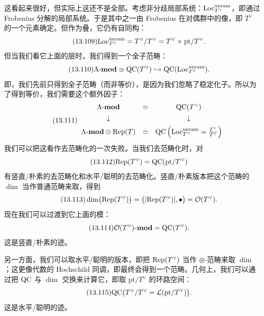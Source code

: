 这看起来很好，但实际上这还不是全部。考虑非分歧局部系统：$\mathrm{Loc}^{\mathrm{unram}}_{T^\vee}$，即通过 Frobenius 分解的局部系统。于是其中之一由 Frobenius 在对偶群中的像，即 $T^\vee$ 的一个元素确定。但作为叠，它仍有自同构：
\begin{equation}\tag{13.109}
\mathrm{Loc}^{\mathrm{unram}}_{T^\vee}=T^\vee/T^\vee=T^\vee\times\mathrm{pt}/T^\vee.
\end{equation}
但当我们看它上面的层时，我们得到一个全子范畴：
\begin{equation}\tag{13.110}
\Lambda\text{-}\mathbf{mod}\simeq\mathrm{QC}(T^\vee)\hookrightarrow\mathrm{QC}(\mathrm{Loc}^{\mathrm{unram}}_{T^\vee}).
\end{equation}
即，我们先前只得到全子范畴（而非等价），是因为我们忽略了稳定化子。所以为了得到等价，我们需要这个额外因子：
\begin{equation}\tag{13.111}
\begin{array}{ccc}
\Lambda\text{-}\mathbf{mod} & \simeq & \mathrm{QC}(T^\vee)\\[4pt]
\downarrow & & \downarrow\\[4pt]
\Lambda\text{-}\mathbf{mod}\otimes\mathrm{Rep}(T) & \simeq & \mathrm{QC}\left(\mathrm{Loc}^{\mathrm{unram}}_{T^\vee}=\frac{T^\vee}{T^\vee}\right)
\end{array}
\end{equation}
我们可以把这看作去范畴化的一次失败。当我们去范畴化时，对
\begin{equation}\tag{13.112}
\mathrm{Rep}(T^\vee)=\mathrm{QC}(\mathrm{pt}/T^\vee)
\end{equation}
有竖直/朴素的去范畴化和水平/聪明的去范畴化。竖直/朴素版本把这个范畴的 $\dim$ 当作普通范畴来取，得到
\begin{equation}\tag{13.113}
\dim\bigl(\mathrm{Rep}(T^\vee)\bigr)=\bigl(|\mathrm{Rep}(T^\vee)|,\bullet\bigr)=\mathcal{O}(T^\vee).
\end{equation}
现在我们可以过渡到它上面的模：
\begin{equation}\tag{13.114}
\mathcal{O}(T^\vee)\text{-}\mathbf{mod}=\mathrm{QC}(T^\vee).
\end{equation}
这是竖直/朴素的迹。

另一方面，我们可以取水平/聪明的版本，即把 $\mathrm{Rep}(T^\vee)$ 当作 $\otimes$-范畴来取 $\dim$；这更像代数的 Hochschild 同调，即最终会得到一个范畴。几何上，我们可以通过把 $\mathrm{QC}$ 与 $\dim$ 交换来计算它，即取 $\mathrm{pt}/T^\vee$ 的环路空间：
\begin{equation}\tag{13.115}
\mathrm{QC}\bigl(T^\vee/T^\vee=\mathcal{L}(\mathrm{pt}/T^\vee)\bigr).
\end{equation}
这是水平/聪明的迹。

